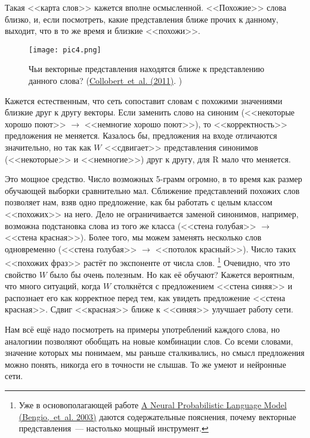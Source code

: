 \documentclass[a4paper,12pt]{article}
\begin{document}
Такая <<карта слов>> кажется вполне осмысленной. <<Похожие>> слова близко, и, если посмотреть, какие представления ближе прочих к данному,  выходит, что в то же время и близкие <<похожи>>.

\begin{figure}[t]
\begin{center}
\texttt{[image: pic4.png]}
\caption{Чьи векторные представления находятся ближе к представлению данного слова? (\href{http://arxiv.org/pdf/1103.0398v1.pdf}{Collobert~et~al. (2011)}. ) }
\end{center}
\end{figure}

Кажется естественным, что сеть сопоставит словам с похожими значениями близкие друг к другу векторы. Если заменить слово на синоним (<<некоторые хорошо поют>> $\rightarrow$ <<немногие хорошо поют>>), то <<корректность>> предложения не меняется. Казалось бы, предложения на входе отличаются значительно, но так как $W$ <<сдвигает>> представления синонимов (<<некоторые>> и <<немногие>>) друг к другу, для R мало что меняется.

Это мощное средство. Число возможных 5-грамм огромно, в то время как размер обучающей выборки сравнительно мал. Сближение представлений похожих слов позволяет нам, взяв одно предложение, как бы работать с целым классом <<похожих>>  на него. Дело не ограничивается заменой синонимов, например, возможна подстановка слова из того же класса (<<стена голубая>> $\rightarrow$ <<стена красная>>). Более того, мы можем заменять несколько слов одновременно (<<стена голубая>> $\rightarrow$ <<потолок красный>>). Число таких <<похожих фраз>> растёт по экспоненте от числа слов. \footnote{Уже в основополагающей работе \href{http://machinelearning.wustl.edu/mlpapers/paper_files/BengioDVJ03.pdf}{A Neural Probabilistic Language Model (Bengio,~et~al. 2003)} даются содержательные пояснения, почему векторные представления~--- настолько мощный инструмент.}
Очевидно, что это свойство $W$ было бы очень полезным. Но как её обучают? Кажется  вероятным, что много ситуаций, когда $W$ столкнётся с предложением <<стена синяя>> и распознает его как корректное перед тем, как увидеть предложение <<стена красная>>. Сдвиг <<красная>> ближе к <<синяя>> улучшает работу сети.

Нам всё ещё надо посмотреть на примеры употреблений каждого слова, но аналогиии позволяют обобщать на новые комбинации слов. Со всеми словами, значение которых мы понимаем, мы раньше сталкивались, но смысл предложения можно понять, никогда его в точности не слышав. То же умеют и нейронные сети.
\end{document}
